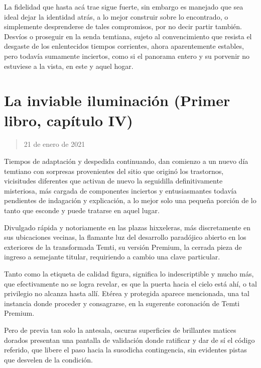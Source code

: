 \documentclass[
]{book}
\begin{document}
La fidelidad que hasta acá trae sigue fuerte, sin embargo es manejado que sea ideal dejar la identidad atrás, a lo mejor construir sobre lo encontrado, o simplemente desprenderse de tales compromisos, por no decir partir también. Desvíos o proseguir en la senda temtiana, sujeto al convencimiento que resista el desgaste de los enlentecidos tiempos corrientes, ahora aparentemente estables, pero todavía sumamente inciertos, como si el panorama entero y su porvenir no estuviese a la vista, en este y aquel hogar.

\hypertarget{la-inviable-iluminaciuxf3n-primer-libro-capuxedtulo-iv}{%
\section{La inviable iluminación (Primer libro, capítulo IV)}\label{la-inviable-iluminaciuxf3n-primer-libro-capuxedtulo-iv}}

\begin{quote}
21 de enero de 2021
\end{quote}

Tiempos de adaptación y despedida continuando, dan comienzo a un nuevo día temtiano con sorpresas provenientes del sitio que originó los trastornos, vicisitudes diferentes que activan de nuevo la seguidilla definitivamente misteriosa, más cargada de componentes inciertos y entusiasmantes todavía pendientes de indagación y explicación, a lo mejor solo una pequeña porción de lo tanto que esconde y puede tratarse en aquel lugar.

Divulgado rápida y notoriamente en las plazas hixxeleras, más discretamente en sus ubicaciones vecinas, la flamante luz del desarrollo paradójico abierto en los exteriores de la transformada Temti, su versión Premium, la cerrada pieza de ingreso a semejante titular, requiriendo a cambio una clave particular.

Tanto como la etiqueta de calidad figura, significa lo indescriptible y mucho más, que efectivamente no se logra revelar, es que la puerta hacia el cielo está ahí, o tal privilegio no alcanza hasta allí. Etérea y protegida aparece mencionada, una tal instancia donde proceder y consagrarse, en la sugerente coronación de Temti Premium.

Pero de previa tan solo la antesala, oscuras superficies de brillantes matices dorados presentan una pantalla de validación donde ratificar y dar de sí el código referido, que libere el paso hacia la susodicha contingencia, sin evidentes pistas que desvelen de la condición.
\end{document}
